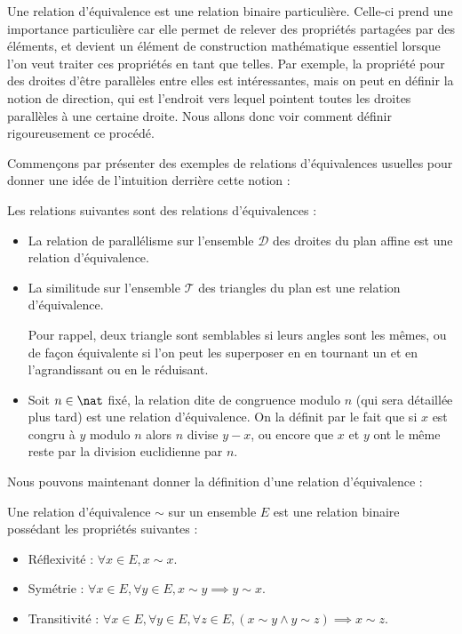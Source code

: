 Une relation d'équivalence est une relation binaire particulière. Celle-ci prend une importance particulière car elle permet de relever des propriétés partagées par des éléments, et devient un élément de construction mathématique essentiel lorsque l'on veut traiter ces propriétés en tant que telles. Par exemple, la propriété pour des droites d'être parallèles entre elles est intéressantes, mais on peut en définir la notion de direction, qui est \og l'endroit vers lequel pointent toutes les droites parallèles à une certaine droite\fg{}. Nous allons donc voir comment définir rigoureusement ce procédé.

Commençons par présenter des exemples de relations d'équivalences usuelles pour donner une idée de l'intuition derrière cette notion :
\begin{expl}
    Les relations suivantes sont des relations d'équivalences :
    \begin{itemize}[label=$\bullet$]
        \item La relation de parallélisme sur l'ensemble $\mathcal D$ des droites du plan affine est une relation d'équivalence.
        \item La similitude sur l'ensemble $\mathcal T$ des triangles du plan est une relation d'équivalence. 
        
        Pour rappel, deux triangle sont semblables si leurs angles sont les mêmes, ou de façon équivalente si l'on peut les superposer en en tournant un et en l'agrandissant ou en le réduisant.
        \item Soit $n\in\nat$ fixé, la relation dite de congruence modulo $n$ (qui sera détaillée plus tard) est une relation d'équivalence. On la définit par le fait que si $x$ est congru à $y$ modulo $n$ alors $n$ divise $y-x$, ou encore que $x$ et $y$ ont le même reste par la division euclidienne par $n$.
    \end{itemize}
\end{expl}

Nous pouvons maintenant donner la définition d'une relation d'équivalence :

\begin{defi}
    Une relation d'équivalence $\sim$ sur un ensemble $E$ est une relation binaire possédant les propriétés suivantes :
    \begin{itemize}[label=]
        \item Réflexivité : $\forall x \in E, x\sim x$.
        \item Symétrie : $\forall x\in E, \forall y \in E, x\sim y \implies y\sim x$.
        \item Transitivité : $\forall x\in E, \forall y \in E, \forall z \in E, (x\sim y \land y\sim z) \implies x\sim z$.
    \end{itemize}
\end{defi}

